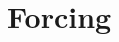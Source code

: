 \documentclass[../main]{subfiles}
\begin{document}
\chapter{Forcing}
\label{apx.forcing}
\thispagestyle{fancy}

\lipsum[1]
\end{document}
